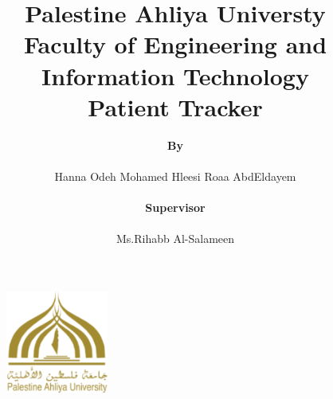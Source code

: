 \documentclass[12pt]{article}
\title{{\large \textbf{Palestine Ahliya Universty}
	\\
	\textbf{Faculty of Engineering and Information Technology}}\vspace{2cm}
	\\
	
	\textbf{{\Huge Patient Tracker}}\vspace{1cm}}
\author{\textbf{By}
	\\\\
	Hanna Odeh\qquad \qquad \quad
	Mohamed Hleesi\qquad \quad
	Roaa AbdEldayem
	\\\\
	\textbf{Supervisor}
	\\\\
	Ms.Rihabb Al-Salameen
}
\date{}
\begin{document}
	
	\begin{figure}[!t]
		\centering
		\includegraphics[width=0.30\textwidth]{icon.png}
		\vspace{-1.5cm}
	\end{figure}

	\maketitle
	\thispagestyle{empty}
	
\end{document}
